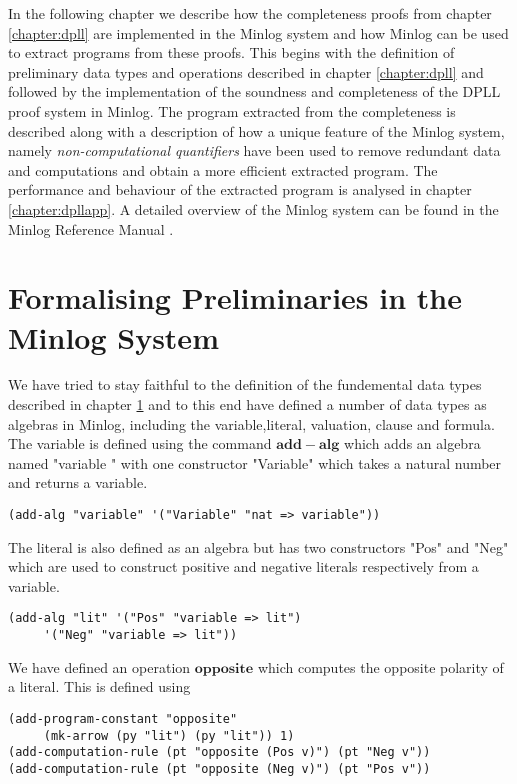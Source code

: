  \label{chapter:dpllminlog}
In the following chapter we describe how the completeness proofs from chapter \ref{chapter:dpll} are implemented in the Minlog system and how Minlog can be used to extract programs from these proofs.  This begins with the definition of preliminary data types and operations described in chapter \ref{chapter:dpll} and followed by the implementation of the soundness and completeness of the DPLL proof system in Minlog. The program extracted from the completeness is described along with a description of how a unique feature of the Minlog system, namely \emph{non-computational quantifiers} have been used to remove redundant data and computations and obtain a more efficient extracted program. The performance and behaviour of the extracted program is analysed in chapter \ref{chapter:dpllapp}. A detailed overview of the Minlog system can be found in the Minlog Reference Manual \cite{MinlogRef}.

\section{Formalising Preliminaries in the Minlog System}
We have tried to stay faithful to the definition of the fundemental data types described in chapter \ref{} and to this end have defined a number of data types as algebras in Minlog, including the variable,literal, valuation, clause and formula. The variable is defined using the command $\mathbf{add-alg}$ which adds an algebra named "variable " with one constructor "Variable" which takes a natural number and returns a variable.
\begin{lstlisting}[caption = "Definition of a variable in Minlog"]
(add-alg "variable" '("Variable" "nat => variable"))
\end{lstlisting}
The literal is also defined as an algebra but has two constructors "Pos" and "Neg" which are used to construct positive and negative literals respectively from a variable.
\begin{lstlisting}[caption = "Definition of a literal in Minlog"]
(add-alg "lit" '("Pos" "variable => lit")
     '("Neg" "variable => lit"))
\end{lstlisting}

We have defined an operation $\mathbf{opposite}$ which computes the opposite polarity of a literal. This is defined using

\begin{lstlisting}[caption = "Definition of the opposite operation in the Minlog System"]
(add-program-constant "opposite" 
     (mk-arrow (py "lit") (py "lit")) 1)
(add-computation-rule (pt "opposite (Pos v)") (pt "Neg v"))
(add-computation-rule (pt "opposite (Neg v)") (pt "Pos v"))
\end{lstlisting}


